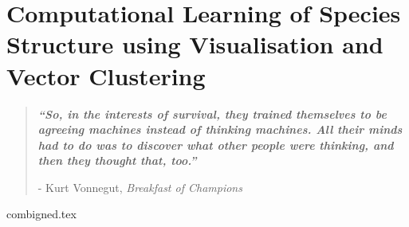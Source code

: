 

\chapter{ Computational Learning of Species Structure using Visualisation and Vector Clustering}\label{ch5}


\blankpage
\restoregeometry
\vspace*{0.15\paperheight}


\begin{center}
\begin{quotation}
  \large{\emph{\textbf{``So, in the interests of survival, they trained themselves to be agreeing machines instead of thinking machines. All their minds had to do was to discover what other people were thinking, and then they thought that, too.''} }  }  \\
  \begin{flushright}
  - Kurt Vonnegut, \textit{Breakfast of Champions}
  \end{flushright}
 \end{quotation}
\end{center}
\doublespacing
\newpage

%





{combigned.tex}

\chapterbib

